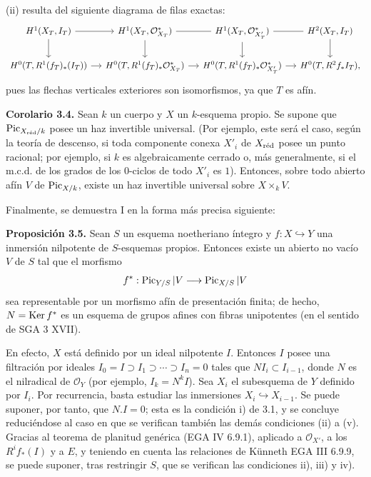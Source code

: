 (ii) resulta del siguiente diagrama de filas exactas:
\[
\begin{tikzcd}[column sep=small]
H^1(X_T,I_T) \arrow[r] \arrow[d] &
H^1(X_T,\mathcal O_{X_T}^{*}) \arrow[r,dash] \arrow[d] &
H^1(X_T,\mathcal O_{X'_T}^{*}) \arrow[r,dash] \arrow[d] &
H^2(X_T,I_T) \arrow[d]\\
H^0(T,R^1(f_T)_*(I_T)) \arrow[r] &
H^0(T,R^1(f_T)_*\mathcal O_{X_T}^{*}) \arrow[r] &
H^0(T,R^1(f_T)_*\mathcal O_{X'_T}^{*}) \arrow[r] &
H^0(T,R^2f_*I_T),
\end{tikzcd}
\]
pues las flechas verticales exteriores son isomorfismos, ya que $T$ es
afín.

\textbf{Corolario 3.4.} Sean $k$ un cuerpo y $X$ un $k$-esquema propio. Se
supone que $\Pic_{X_{\red}/k}$ posee un haz invertible universal. (Por
ejemplo, este será el caso, según la teoría de descenso, si toda componente
conexa $X'_i$ de $X_{\red}$ posee un punto racional; por ejemplo, si $k$ es
algebraicamente cerrado o, más generalmente, si el m.c.d. de los grados de
los $0$-ciclos de todo $X'_i$ es $1$). Entonces, sobre todo abierto afín
$V$ de $\Pic_{X/k}$, existe un haz invertible universal sobre
$X\times_kV$.

Finalmente, se demuestra I en la forma más precisa siguiente:

\textbf{Proposición 3.5.} Sean $S$ un esquema noetheriano íntegro y
$f:X\hookrightarrow Y$ una inmersión nilpotente de $S$-esquemas propios.
Entonces existe un abierto no vacío $V$ de $S$ tal que el morfismo
\[
f^*:\Pic_{Y/S}|V\longrightarrow\Pic_{X/S}|V
\]
sea representable por un morfismo afín de presentación finita; de hecho,
$N=\Ker f^*$ es un esquema de grupos afines con fibras unipotentes (en el
sentido de SGA 3 XVII).

En efecto, $X$ está definido por un ideal nilpotente $I$. Entonces $I$
posee una filtración por ideales
$I_0=I\supset I_1\supset\cdots\supset I_n=0$ tales que
$NI_i\subset I_{i-1}$, donde $N$ es el nilradical de $\mathcal O_Y$ (por
ejemplo, $I_k=N^kI$). Sea $X_i$ el subesquema de $Y$ definido por $I_i$.
Por recurrencia, basta estudiar las inmersiones
$X_i\hookrightarrow X_{i-1}$. Se puede suponer, por tanto, que $N.I=0$;
esta es la condición i) de 3.1, y se concluye reduciéndose al caso en que se
verifican también las demás condiciones (ii) a (v). Gracias al teorema de
planitud genérica (EGA IV 6.9.1), aplicado a $\mathcal O_{X'}$, a los %
$R^if_*(I)$ y a $E$, y teniendo en cuenta las relaciones de Künneth EGA III
6.9.9, se puede suponer, tras restringir $S$, que se verifican las
condiciones ii), iii) y iv).


